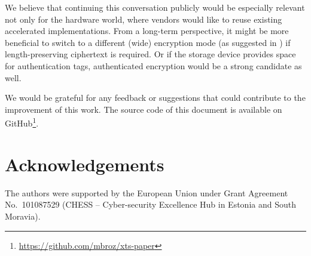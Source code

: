 \documentclass[a4paper]{article}
\begin{document}
We believe that continuing this conversation publicly would be especially relevant not only for the hardware world, where vendors would like to reuse existing accelerated implementations.
From a long-term perspective, it might be more beneficial to switch to a different (wide) encryption mode (as suggested in \cite{rogaway2011evaluation}) if length-preserving ciphertext is required. Or if the storage device provides space for authentication tags, authenticated encryption would be a strong candidate as well.

We would be grateful for any feedback or suggestions that could contribute to the improvement of this work. The source code of this document is available on GitHub\footnote{\url{https://github.com/mbroz/xts-paper}}.

\section*{Acknowledgements}
The authors were supported by the European Union under Grant Agreement No.~101087529 (CHESS -- Cyber-security Excellence Hub in Estonia and South Moravia).

\clearpage



\end{document}
